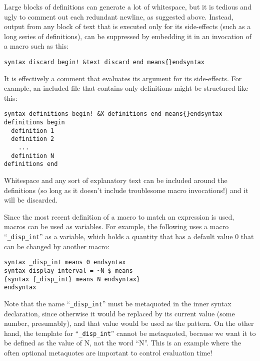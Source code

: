 \documentclass[12pt]{article}
\begin{document}
Large blocks of definitions can generate a lot of whitespace, but it is tedious and ugly to comment out each redundant newline, as suggested above.
Instead, output from any block of text that is executed only for its side-effects (such as a long series of definitions), can be suppressed by embedding it in an invocation of a macro such as this:
\begin{lstlisting}[frame=single]
syntax discard begin! &text discard end means{}endsyntax
\end{lstlisting}
It is effectively a comment that evaluates its argument for its side-effects.
For example, an included file that contains only definitions might be structured like this:
\begin{lstlisting}[frame=single]
syntax definitions begin! &X definitions end means{}endsyntax
definitions begin
  definition 1
  definition 2
    ...
  definition N
definitions end
\end{lstlisting}
Whitespace and any sort of explanatory text can be included around the definitions (so long as it doesn't include troublesome macro invocations!) and it will be discarded.

Since the most recent definition of a macro to match an expression is used, macros can be used as variables.
For example, the following uses a macro ``\lstinline"_disp_int"'' as a variable, which holds a quantity that has a default value 0 that can be changed by another macro:
\begin{lstlisting}[frame=single]
syntax _disp_int means 0 endsyntax
syntax display interval = ~N $ means
{syntax {_disp_int} means N endsyntax}
endsyntax
\end{lstlisting}
Note that the name ``\lstinline"_disp_int"'' must be metaquoted in the inner syntax declaration, since otherwise it would be replaced by its current value (some number, presumably), and that value would be used as the pattern.
On the other hand, the template for ``\lstinline"_disp_int"'' cannot be metaquoted, because we want it to be defined as the value of N, not the word ``N''.
This is an example where the often optional metaquotes are important to control evaluation time!
\end{document}
